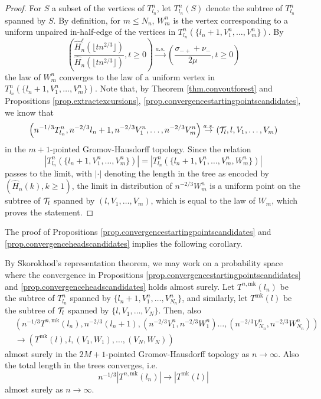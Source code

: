 \begin{proof}
For $S$ a subset of the vertices of $T^n_{l_n}$, let $T^n_{l_n}(S)$ denote the subtree of $T^n_{l_n}$ spanned by $S$. By definition, for $m\leq N_n$, $W^n_m$ is the vertex corresponding to a uniform unpaired in-half-edge of the vertices in $T^n_{l_n}\left(\{l_n+1,V^n_1,\dots,V^n_{m}\}\right)$. By 
$$\left(\frac{\hat{H}_n^\ell\left(\lfloor t n^{2/3}\rfloor \right)}{\hat{H}_n\left(\lfloor t n^{2/3}\rfloor \right)},t\geq 0\right)\overset{a.s.}{\to} \left(\frac{\sigma_{-+}+\nu_-}{2\mu},t\geq 0\right)$$
the law of $W^n_m$ converges to the law of a uniform vertex in $T^n_{l_n}\left(\{l_n+1,V^n_1,\dots,V^n_{m}\}\right)$. 
Note that, by Theorem \ref{thm.convoutforest} and  Propositions \ref{prop.extractexcursions}, \ref{prop.convergencestartingpointscandidates}, we know that
$$\left(n^{-1/3}T^n_{l_n},n^{-2/3}l_n+1,n^{-2/3}V^n_1,\dots,n^{-2/3}V^n_{m}\right)\overset{a.s.}{\to}\left({\mathcal T}_l, l,V_1,\dots,V_m\right)$$
in the $m+1$-pointed Gromov-Hausdorff topology. Since the relation $$\left|T^n_{l_n}\left(\{l_n+1,V^n_1,\dots,V^n_{m}\}\right)\right|=\left|T^n_{l_n}\left(\{l_n+1,V^n_1,\dots,V^n_{m}, W^n_{m}\}\right)\right|$$ passes to the limit, with $|\cdot|$ denoting the length in the tree as encoded by $(\hat{H}_n(k),k\geq 1)$, the limit in distribution of $n^{-2/3}W^n_m$ is a uniform point on the subtree of ${\mathcal T}_l$ spanned by $\left(l,V_1,\dots,V_m\right)$, which is equal to the law of $W_m$, which proves the statement.

\end{proof}
The proof of Propositions \ref{prop.convergencestartingpointscandidates} and \ref{prop.convergenceheadscandidates} implies the following corollary.
\begin{corollary}
By Skorokhod's representation theorem, we may work on a probability space where the convergence in Propositions \ref{prop.convergencestartingpointscandidates} and \ref{prop.convergenceheadscandidates} holds almost surely. Let $T^{n,\text{mk}}(l_n)$ be the subtree of $T^n_{l_n}$ spanned by $\{l_n+1,V^n_1,\dots,V^n_{N_n}\}$, and similarly, let $T^{\text{mk}}(l)$ be the subtree of ${\mathcal T}_l$ spanned by $\{l,V_1,\dots,V_N\}$. Then, also 
\begin{align*}&\left(n^{-1/3}T^{n,\text{mk}}(l_n), n^{-2/3}(l_n+1), \left(n^{-2/3}V^n_1,n^{-2/3}W^n_1\right) \dots, \left(n^{-2/3}V^n_{N_n}, n^{-2/3}W^n_{N_n}\right)\right)\\
&\to \left(T^{\text{mk}}(l), l, (V_1,W_1),\dots, (V_{N},W_{N})\right)\end{align*}
almost surely in the $2M+1$-pointed Gromov-Hausdorff topology as $n\to \infty$. Also the total length in the trees converges, i.e.
$$n^{-1/3}\left|T^{n,\text{mk}}(l_n)\right|\to \left| T^{\text{mk}}(l)\right|$$
almost surely as $n\to\infty$.
\end{corollary}
